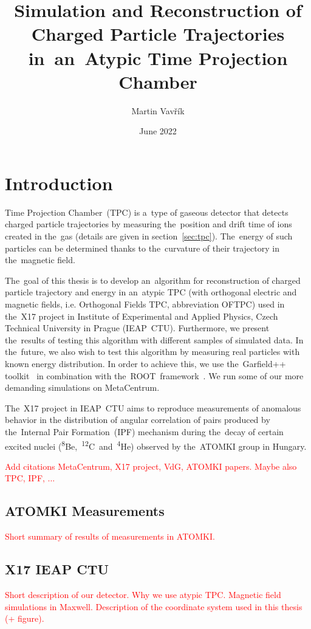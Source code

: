 \documentclass[]{article}
\title{Simulation and Reconstruction of Charged Particle Trajectories in~an~Atypic Time Projection Chamber}
\author{Martin Vavřík}
\date{June 2022}
\newcommand{\iso}[2]{\textsuperscript{#2}#1}   %
\begin{document}
	
	\maketitle
	
	\section{Introduction}
	Time Projection Chamber~(TPC) is a~type of gaseous detector that detects charged particle trajectories by measuring the~position and drift time of ions created in the~gas (details are given in section~\ref{sec:tpc}). The~energy of such particles can be determined thanks to the~curvature of their trajectory in the~magnetic field.
	
	The~goal of this thesis is to develop an~algorithm for reconstruction of charged particle trajectory and energy in an~atypic TPC (with orthogonal electric and magnetic fields, i.e. Orthogonal Fields TPC, abbreviation OFTPC) used in the~X17 project in Institute of Experimental and Applied Physics, Czech Technical University in Prague (IEAP~CTU). Furthermore, we present the~results of testing this algorithm with different samples of simulated data. In the~future, we also wish to test this algorithm by measuring real particles with known energy distribution. In order to achieve this, we use the~Garfield++ toolkit~\cite{Garfield++} in combination with the~ROOT~framework~\cite{ROOT}. We run some of our more demanding simulations on MetaCentrum.
	
	The~X17 project in IEAP~CTU aims to reproduce measurements of anomalous behavior in the distribution of angular correlation of pairs produced by the~Internal Pair Formation~(IPF) mechanism during the~decay of certain excited nuclei (\iso{Be}{8},~\iso{C}{12}~and~\iso{He}{4}) observed by the~ATOMKI group in Hungary. 
	
	\textcolor{red}{Add citations MetaCentrum, X17 project, VdG, ATOMKI papers. Maybe also TPC, IPF, ...}
	
	\subsection{ATOMKI Measurements}
	\textcolor{red}{Short summary of results of measurements in ATOMKI.}
	
	\subsection{X17 IEAP CTU}
	\label{sec:IEAP}
	\textcolor{red}{Short description of our detector. Why we use atypic TPC. Magnetic field simulations in Maxwell. Description of the coordinate system used in this thesis (+ figure).}
	
\end{document}
